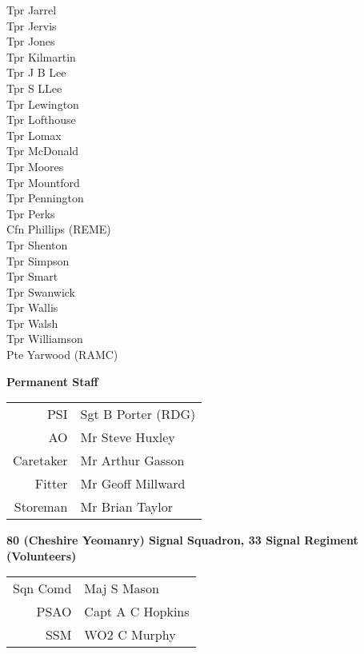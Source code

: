 \begin{multicols}{3}
  Tpr Jarrel \\
  Tpr Jervis \\
  Tpr Jones \\
  Tpr Kilmartin \\
  Tpr J B Lee \\
  Tpr S LLee \\
  Tpr Lewington \\
  Tpr Lofthouse \\
  Tpr Lomax \\
  Tpr McDonald \\
  Tpr Moores \\
  Tpr Mountford \\
  Tpr Pennington \\
  Tpr Perks \\
  Cfn Phillips (REME) \\
  Tpr Shenton \\
  Tpr Simpson \\
  Tpr Smart \\
  Tpr Swanwick \\
  Tpr Wallis \\
  Tpr Walsh \\
  Tpr Williamson \\
  Pte Yarwood (RAMC) \\
\end{multicols}

\begin{center}
  \Large
  \textbf{Permanent Staff}
\end{center}

\begin{center}
  \begin{tabular}{rl}
    PSI & Sgt B Porter (RDG) \\
    AO & Mr Steve Huxley \\
    Caretaker & Mr Arthur Gasson \\
    Fitter & Mr Geoff Millward \\
    Storeman & Mr Brian Taylor \\
  \end{tabular}
\end{center}

\vspace*{10mm}

\begin{center}
  \Large
  \textbf{80 (Cheshire Yeomanry) Signal Squadron, 33 Signal Regiment (Volunteers)}
\end{center}

\begin{center}
  \begin{tabular}{rl}
    Sqn Comd & Maj S Mason \\
    PSAO & Capt A C Hopkins \\
    SSM & WO2 C Murphy \\
  \end{tabular}
\end{center}

